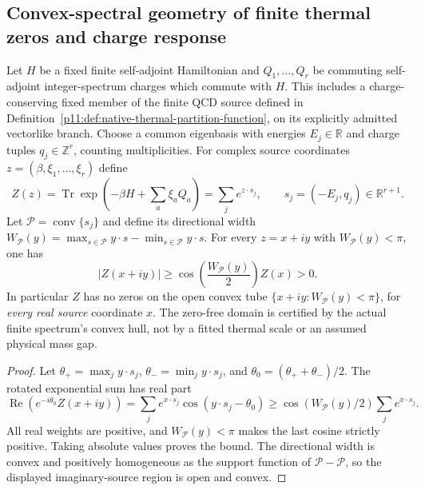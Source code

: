 \documentclass[12pt,a4paper]{article}
\begin{document}
\subsection{Convex-spectral geometry of finite thermal zeros and charge response}
\label{p11:sec:cc13-zero-free-polytope}

\begin{theorem}
\label{p11:thm:cc13-zero-free-polytope}
Let $H$ be a fixed finite self-adjoint Hamiltonian and
$Q_1,\ldots,Q_r$ be commuting self-adjoint integer-spectrum charges
which commute with $H$.  This includes a charge-conserving fixed
member of the finite QCD source defined in
Definition~\ref{p11:def:native-thermal-partition-function}, on its
explicitly admitted vectorlike branch.  Choose a common eigenbasis
with energies $E_j\in\mathbb R$ and charge tuples
$q_j\in\mathbb Z^r$, counting multiplicities.  For complex source
coordinates $z=(\beta,\xi_1,\ldots,\xi_r)$ define
\[
 Z(z)=\operatorname{Tr}\exp(-\beta H+\sum_a\xi_aQ_a)
 =\sum_j e^{z\cdot s_j},\qquad s_j=(-E_j,q_j)\in\mathbb R^{r+1}.
\]
Let $\mathcal P=\operatorname{conv}\{s_j\}$ and define its directional
width $W_{\mathcal P}(y)=\max_{s\in\mathcal P}y\cdot s
-\min_{s\in\mathcal P}y\cdot s$.  For every $z=x+iy$ with
$W_{\mathcal P}(y)<\pi$, one has
\begin{equation}\label{p11:eq:cc13-zero-free-lower}
 \boxed{|Z(x+iy)|\ge
 \cos\!\left(\frac{W_{\mathcal P}(y)}2\right)Z(x)>0.}
\end{equation}
In particular $Z$ has no zeros on the open convex tube
$\{x+iy:W_{\mathcal P}(y)<\pi\}$, for \emph{every real source}
coordinate $x$.  The zero-free domain is certified by the actual
finite spectrum's convex hull, not by a fitted thermal scale or
an assumed physical mass gap.
\end{theorem}
\begin{proof}
Let $\theta_+=\max_j y\cdot s_j$,
$\theta_-=\min_j y\cdot s_j$, and
$\theta_0=(\theta_++\theta_-)/2$.  The rotated exponential sum
has real part
\[
 \operatorname{Re}(e^{-i\theta_0}Z(x+iy))
 =\sum_j e^{x\cdot s_j}\cos(y\cdot s_j-\theta_0)
 \ge\cos(W_{\mathcal P}(y)/2)\sum_j e^{x\cdot s_j}.
\]
All real weights are positive, and $W_{\mathcal P}(y)<\pi$
makes the last cosine strictly positive.  Taking absolute values
proves the bound.  The directional width is convex and positively
homogeneous as the support function of $\mathcal P-\mathcal P$,
so the displayed imaginary-source region is open and convex.
\end{proof}
\end{document}
